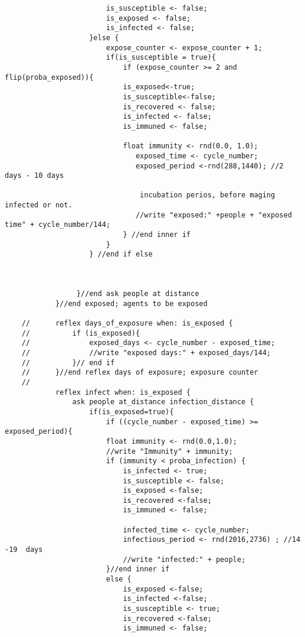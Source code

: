 \begin{lstlisting}
                        is_susceptible <- false;
                        is_exposed <- false;
                        is_infected <- false;
                    }else {
                        expose_counter <- expose_counter + 1;
                        if(is_susceptible = true){
                            if (expose_counter >= 2 and flip(proba_exposed)){
                            is_exposed<-true;
                            is_susceptible<-false;
                            is_recovered <- false;
                            is_infected <- false;
                            is_immuned <- false;
                            
                            float immunity <- rnd(0.0, 1.0);
                               exposed_time <- cycle_number;
                               exposed_period <-rnd(288,1440); //2 days - 10 days
                               
                                incubation perios, before maging infected or not.
                               //write "exposed:" +people + "exposed time" + cycle_number/144;
                            } //end inner if
                        }
                    } //end if else
                    
                    
                        
                 }//end ask people at distance
            }//end exposed; agents to be exposed
               
    //		reflex days_of_exposure when: is_exposed {
    //			if (is_exposed){
    //		   		exposed_days <- cycle_number - exposed_time;
    //		   		//write "exposed days:" + exposed_days/144;
    //		   	}// end if	
    //		}//end reflex days of exposure; exposure counter 
    //			
            reflex infect when: is_exposed {
                ask people at_distance infection_distance {
                    if(is_exposed=true){
                        if ((cycle_number - exposed_time) >= exposed_period){
                        float immunity <- rnd(0.0,1.0);
                        //write "Immunity" + immunity;
                        if (immunity < proba_infection) {
                            is_infected <- true;
                            is_susceptible <- false;
                            is_exposed <-false;
                            is_recovered <-false;
                            is_immuned <- false;
                            
                            infected_time <- cycle_number;
                            infectious_period <- rnd(2016,2736) ; //14 -19  days
                            //write "infected:" + people;
                        }//end inner if
                        else {
                            is_exposed <-false;
                            is_infected <-false;
                            is_susceptible <- true;
                            is_recovered <-false;
                            is_immuned <- false; 
                            

\end{lstlisting}
